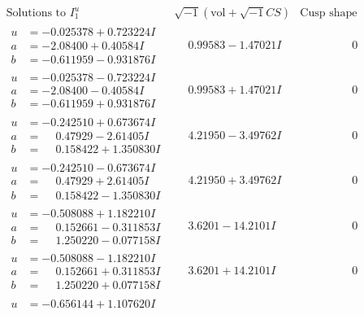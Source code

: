 \documentclass[1p]{elsarticle_modified}
\theoremstyle{definition}
\newcommand{\I}{\sqrt{-1}}
\begin{document}
$$\begin{array}{c|c|c}
\text{Solutions to }I^u_{1}& \I (\text{vol} + \sqrt{-1}CS) & \text{Cusp shape}\\
 \hline 
\begin{aligned}
u &= -0.025378 + 0.723224 I \\
a &= -2.08400 + 0.40584 I \\
b &= -0.611959 - 0.931876 I\end{aligned}
 & \phantom{-}0.99583 - 1.47021 I & \phantom{-0.000000 } 0 \\ \hline\begin{aligned}
u &= -0.025378 - 0.723224 I \\
a &= -2.08400 - 0.40584 I \\
b &= -0.611959 + 0.931876 I\end{aligned}
 & \phantom{-}0.99583 + 1.47021 I & \phantom{-0.000000 } 0 \\ \hline\begin{aligned}
u &= -0.242510 + 0.673674 I \\
a &= \phantom{-}0.47929 - 2.61405 I \\
b &= \phantom{-}0.158422 + 1.350830 I\end{aligned}
 & \phantom{-}4.21950 - 3.49762 I & \phantom{-0.000000 } 0 \\ \hline\begin{aligned}
u &= -0.242510 - 0.673674 I \\
a &= \phantom{-}0.47929 + 2.61405 I \\
b &= \phantom{-}0.158422 - 1.350830 I\end{aligned}
 & \phantom{-}4.21950 + 3.49762 I & \phantom{-0.000000 } 0 \\ \hline\begin{aligned}
u &= -0.508088 + 1.182210 I \\
a &= \phantom{-}0.152661 - 0.311853 I \\
b &= \phantom{-}1.250220 - 0.077158 I\end{aligned}
 & \phantom{-}3.6201 - 14.2101 I & \phantom{-0.000000 } 0 \\ \hline\begin{aligned}
u &= -0.508088 - 1.182210 I \\
a &= \phantom{-}0.152661 + 0.311853 I \\
b &= \phantom{-}1.250220 + 0.077158 I\end{aligned}
 & \phantom{-}3.6201 + 14.2101 I & \phantom{-0.000000 } 0 \\ \hline\begin{aligned}
u &= -0.656144 + 1.107620 I \\

\end{aligned}
\end{array}$$
\end{document}
